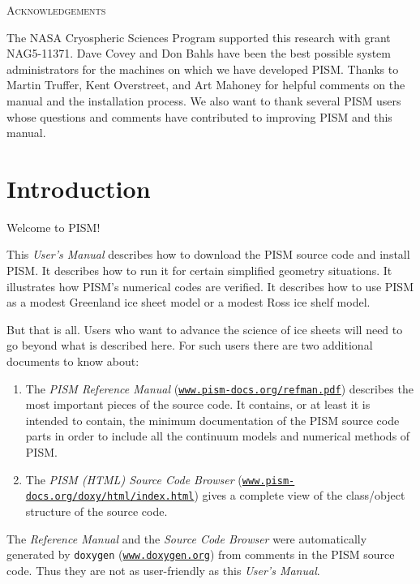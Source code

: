 \documentclass[11pt,final]{amsart}
\renewcommand{\t}[1]{\texttt{#1}}
\begin{document}
\centerline{\textsc{Acknowledgements}}
\bigskip

The NASA Cryospheric Sciences Program supported this research with grant NAG5-11371.  Dave Covey and Don Bahls have been the best possible system administrators for the machines on which we have developed PISM.  Thanks to Martin Truffer, Kent Overstreet, and Art Mahoney for helpful comments on the manual and the installation process.  We also want to thank several PISM users whose questions and comments have contributed to improving PISM and this manual.

\newpage
\setcounter{tocdepth}{2}
\tableofcontents


\newpage
\section{Introduction}\label{sect:intro}

Welcome to PISM!

This \emph{User's Manual} describes how to download the PISM source code and install PISM.  It describes how to run it for certain simplified geometry situations.  It illustrates how PISM's numerical codes are verified.  It describes how to use PISM as a modest Greenland ice sheet model or a modest Ross ice shelf model.

But that is all.  Users who want to advance the science of ice sheets will need to go beyond what is described here.  For such users there are two additional documents to know about:
\begin{enumerate}
 \item  The \emph{PISM Reference Manual} (\href{http://www.pism-docs.org/refman.pdf}{\t{www.pism-docs.org/refman.pdf}})
describes the most important pieces of the source code.  It contains, or at least it is intended to contain, the minimum documentation of the PISM source code parts in order to include all the continuum models and numerical methods of PISM.
 \item  The \emph{PISM (HTML) Source Code Browser} (\href{http://www.pism-docs.org/doxy/html/index.html}{\t{www.pism-docs.org/doxy/html/index.html}}) gives a complete view of the class/object structure of the source code.
\end{enumerate}
The \emph{Reference Manual} and the \emph{Source Code Browser} were automatically generated by \verb|doxygen| (\href{http://www.doxygen.org/}{\t{www.doxygen.org}}) from comments in the PISM source code.  Thus they are not as user-friendly as this \emph{User's Manual}.
\end{document}
